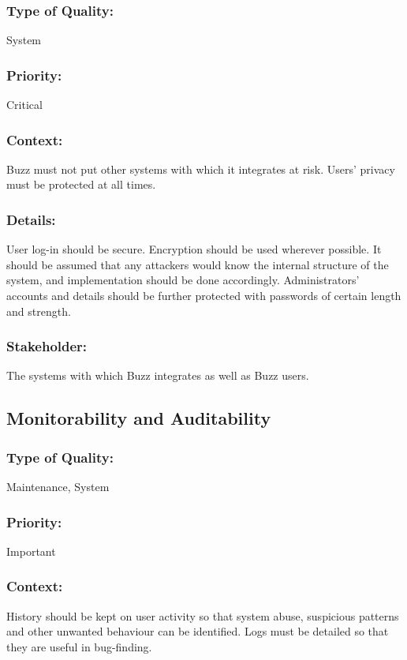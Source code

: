 \documentclass[11pt]{article}
\begin{document}
		\subsubsection{Type of Quality:}
			\textbf{}System
		
		\subsubsection{Priority:}
			\textbf{}Critical

		\subsubsection{Context:}
			\textbf{}Buzz must not put other systems with which it integrates at risk. Users’ privacy must be protected at all times. 
		
		\subsubsection{Details:}
			\textbf{}User log-in should be secure. Encryption should be used wherever possible. It should be assumed that any attackers would know the internal structure of the system, and implementation should be done accordingly. Administrators’ accounts and details should be further protected with passwords of certain length and strength.
		
		\subsubsection{Stakeholder:}
			\textbf{}The systems with which Buzz integrates as well as Buzz users.

	\subsection{Monitorability and Auditability}
		\subsubsection{Type of Quality:}
			\textbf{}Maintenance, System
		
		\subsubsection{Priority:}
			\textbf{}Important

		\subsubsection{Context:}
			\textbf{}History should be kept on user activity so that system abuse, suspicious patterns and other unwanted behaviour can be identified. Logs must be detailed so that they are useful in bug-finding.
		
\end{document}
